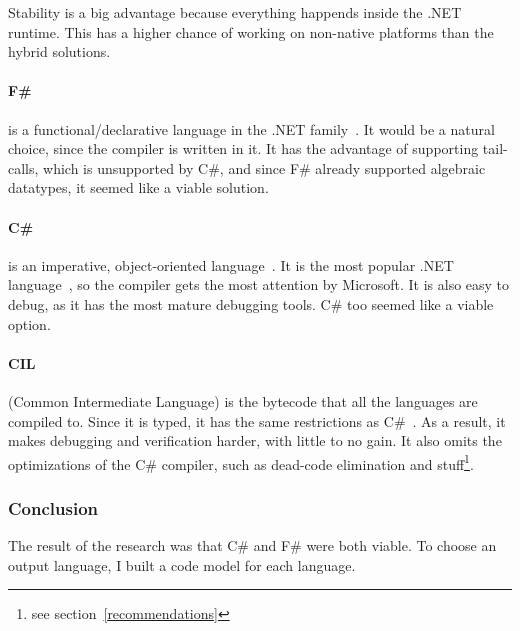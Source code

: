 Stability is a big advantage because everything happends inside the .NET runtime.
This has a higher chance of working on non-native platforms than the hybrid solutions.

\paragraph{F\#} is a functional/declarative language in the .NET family~\cite{fsharp}.
It would be a natural choice, since the compiler is written in it.
It has the advantage of supporting tail-calls, which is unsupported by C\#,
  and since F\# already supported algebraic datatypes, it seemed like a viable solution.


\paragraph{C\#}
is an imperative, object-oriented language~\cite{csharp}.
It is the most popular .NET language~\cite{Meyerovich}, so the compiler gets the most attention by Microsoft.
It is also easy to debug, as it has the most mature debugging tools.
C\# too seemed like a viable option.


\paragraph{CIL}
(Common Intermediate Language) is the bytecode that all the languages are compiled to.
Since it is typed, it has the same restrictions as C\#~\cite{ecma335}.
As a result, it makes debugging and verification harder, with little to no gain.
It also omits the optimizations of the C\# compiler, such as dead-code elimination and stuff\footnote{see section~\ref{recommendations}}.

\subsubsection{Conclusion}
The result of the research was that C\# and F\# were both viable.
To choose an output language, I built a code model for each language.

